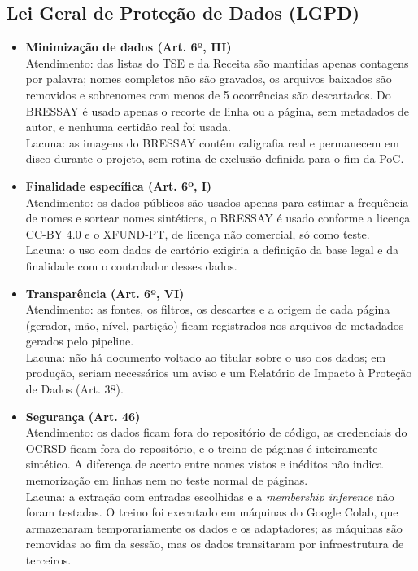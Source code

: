 \subsection{Lei Geral de Proteção de Dados (LGPD)}

\begin{itemize}
    \item \textbf{Minimização de dados (Art. 6º, III)} \\
    Atendimento: das listas do TSE e da Receita são mantidas apenas contagens por palavra; nomes completos não são gravados, os arquivos baixados são removidos e sobrenomes com menos de 5 ocorrências são descartados. Do BRESSAY é usado apenas o recorte de linha ou a página, sem metadados de autor, e nenhuma certidão real foi usada. \\
    Lacuna: as imagens do BRESSAY contêm caligrafia real e permanecem em disco durante o projeto, sem rotina de exclusão definida para o fim da PoC.

    \item \textbf{Finalidade específica (Art. 6º, I)} \\
    Atendimento: os dados públicos são usados apenas para estimar a frequência de nomes e sortear nomes sintéticos, o BRESSAY é usado conforme a licença CC-BY 4.0 e o XFUND-PT, de licença não comercial, só como teste. \\
    Lacuna: o uso com dados de cartório exigiria a definição da base legal e da finalidade com o controlador desses dados.

    \item \textbf{Transparência (Art. 6º, VI)} \\
    Atendimento: as fontes, os filtros, os descartes e a origem de cada página (gerador, mão, nível, partição) ficam registrados nos arquivos de metadados gerados pelo pipeline. \\
    Lacuna: não há documento voltado ao titular sobre o uso dos dados; em produção, seriam necessários um aviso e um Relatório de Impacto à Proteção de Dados (Art. 38).

    \item \textbf{Segurança (Art. 46)} \\
    Atendimento: os dados ficam fora do repositório de código, as credenciais do OCRSD ficam fora do repositório, e o treino de páginas é inteiramente sintético. A diferença de acerto entre nomes vistos e inéditos não indica memorização em linhas nem no teste normal de páginas. \\
    Lacuna: a extração com entradas escolhidas e a \emph{membership inference} não foram testadas. O treino foi executado em máquinas do Google Colab, que armazenaram temporariamente os dados e os adaptadores; as máquinas são removidas ao fim da sessão, mas os dados transitaram por infraestrutura de terceiros.


\end{itemize}
